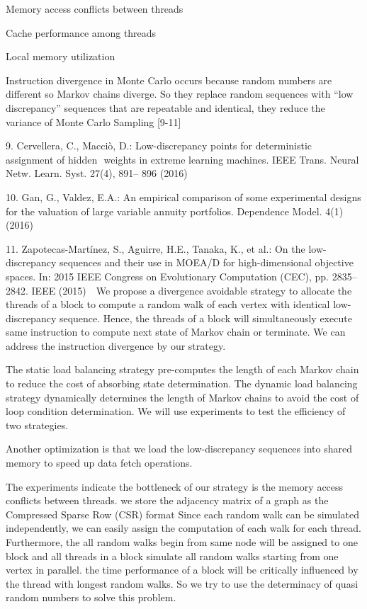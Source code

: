 \documentclass{article}
\begin{document}
Memory access conflicts between threads

Cache performance among threads

Local memory utilization

Instruction divergence in Monte Carlo occurs because random numbers are different so Markov chains diverge.
So they replace random sequences with “low discrepancy” sequences that are repeatable and identical, they reduce the variance of Monte Carlo Sampling [9-11]

9. Cervellera, C., Macciò, D.: Low-discrepancy points for deterministic assignment of hidden  weights in extreme learning machines. IEEE Trans. Neural Netw. Learn. Syst. 27(4), 891– 896 (2016) 

	10.	Gan, G., Valdez, E.A.: An empirical comparison of some experimental designs for the valuation of large variable annuity portfolios. Dependence Model. 4(1) (2016) 

	11.	Zapotecas-Martínez, S., Aguirre, H.E., Tanaka, K., et al.: On the low-discrepancy sequences and their use in MOEA/D for high-dimensional objective spaces. In: 2015 IEEE Congress on Evolutionary Computation (CEC), pp. 2835–2842. IEEE (2015)  
We propose a divergence avoidable strategy to allocate the threads of a block to compute a random walk of each vertex with identical low-discrepancy sequence. Hence, the threads of a block will simultaneously execute same instruction to compute next state of Markov chain or terminate. We can address the instruction divergence by our strategy. 

The static load balancing strategy pre-computes the length of each Markov chain to reduce the cost of absorbing state determination. The dynamic load balancing strategy dynamically determines the length of Markov chains to avoid the cost of loop condition determination. We will use experiments to test the efficiency of two strategies. 

Another optimization is that we load the low-discrepancy sequences into shared memory to speed up data fetch operations. 

The experiments indicate the bottleneck of our strategy is the memory access conflicts between threads. 
we store the adjacency matrix of a graph as the Compressed Sparse Row (CSR) format 
Since each random walk can be simulated independently, we can easily assign the computation of each walk for each thread. Furthermore, the all random walks begin from same node will be assigned to one block and all threads in a block simulate all random walks starting from one vertex in parallel. 
the time performance of a block will be critically influenced by the thread with longest random walks. 
So we try to use the determinacy of quasi random numbers to solve this problem.
\end{document}
